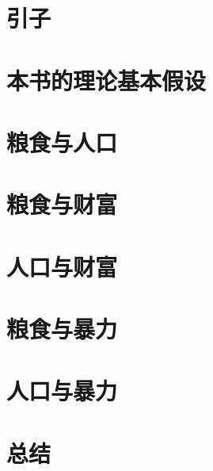 \section{引子}
\section{本书的理论基本假设}
\section{粮食与人口}
\section{粮食与财富}
\section{人口与财富}
\section{粮食与暴力}
\section{人口与暴力}
\section{总结}


